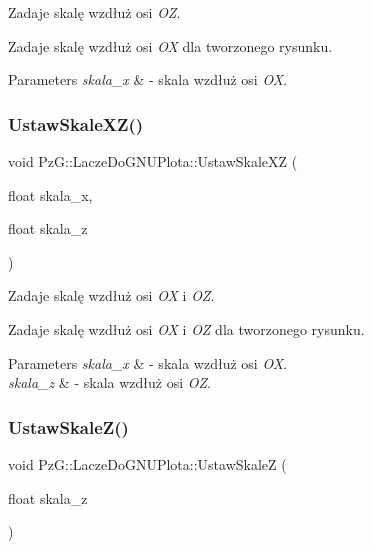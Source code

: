 Zadaje skalę wzdłuż osi {\itshape OZ}. 

Zadaje skalę wzdłuż osi {\itshape OX} dla tworzonego rysunku. 
\begin{DoxyParams}{Parameters}
{\em skala\+\_\+x} & -\/ skala wzdłuż osi {\itshape OX}. \\
\hline
\end{DoxyParams}
\mbox{\label{classPzG_1_1LaczeDoGNUPlota_a4308151b54e105d302803146a3238699}} 
\subsubsection{\texorpdfstring{Ustaw\+Skale\+X\+Z()}{UstawSkaleXZ()}}
{\footnotesize\ttfamily void Pz\+G\+::\+Lacze\+Do\+G\+N\+U\+Plota\+::\+Ustaw\+Skale\+XZ (\begin{DoxyParamCaption}\item[{float}]{skala\+\_\+x,  }\item[{float}]{skala\+\_\+z }\end{DoxyParamCaption})\hspace{0.3cm}{\ttfamily [inline]}}



Zadaje skalę wzdłuż osi {\itshape OX} i {\itshape OZ}. 

Zadaje skalę wzdłuż osi {\itshape OX} i {\itshape OZ} dla tworzonego rysunku. 
\begin{DoxyParams}{Parameters}
{\em skala\+\_\+x} & -\/ skala wzdłuż osi {\itshape OX}. \\
\hline
{\em skala\+\_\+z} & -\/ skala wzdłuż osi {\itshape OZ}. \\
\hline
\end{DoxyParams}
\mbox{\label{classPzG_1_1LaczeDoGNUPlota_ab0486db3166d8db6580a221079af241f}} 
\subsubsection{\texorpdfstring{Ustaw\+Skale\+Z()}{UstawSkaleZ()}}
{\footnotesize\ttfamily void Pz\+G\+::\+Lacze\+Do\+G\+N\+U\+Plota\+::\+Ustaw\+SkaleZ (\begin{DoxyParamCaption}\item[{float}]{skala\+\_\+z }\end{DoxyParamCaption})\hspace{0.3cm}{\ttfamily [inline]}}



